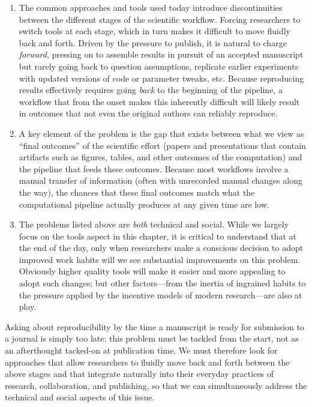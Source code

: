 \documentclass[11pt,oneside,english]{article}
\begin{document}
\begin{enumerate}


\item The common approaches and tools used today introduce discontinuities
  between the different stages of the scientific workflow. Forcing researchers to switch tools
  at each stage, which in turn makes it difficult to move fluidly back and forth.
  Driven by the pressure to publish, it is natural to charge
  \emph{forward}, pressing on to assemble results in pursuit of an accepted
  manuscript but rarely going back to question assumptions, replicate earlier
  experiments with updated versions of code or parameter tweaks, etc.  Because
  reproducing results effectively requires going \emph{back} to the
  beginning of the pipeline, a workflow that from the onset makes this
  inherently difficult will likely result in outcomes that not even the
  original authors can reliably reproduce.

\item A key element of the problem is the gap that exists between what
  we view as ``final outcomes'' of the scientific effort (papers and
  presentations that contain artifacts such as figures, tables, and other
  outcomes of the computation) and the pipeline that feeds these outcomes.
  Because most workflows involve a manual transfer of information (often with
  unrecorded manual changes along the way), the chances that these final
  outcomes match what the computational pipeline actually produces at any
  given time are low.

\item The problems listed above are \emph{both} technical and social.  While we
  largely focus on the tools aspect in this chapter, it is critical to understand
  that at the end of the day, only when researchers make a conscious decision to
  adopt improved work habits will we see substantial improvements on this problem.
  Obviously higher quality tools will make it easier and more appealing to
  adopt such changes; but other factors---from the
  inertia of ingrained habits to the pressure applied by the
  incentive models of modern research---are also at play.
\end{enumerate}
Asking about reproducibility by the time a manuscript is
ready for submission to a journal is simply too late: this problem must be
tackled from the start, not as an afterthought tacked-on at publication time.
We must therefore look for approaches that allow researchers to fluidly move
back and forth between the above stages and that integrate naturally into their
everyday practices of research, collaboration, and publishing, so that we can
simultaneously address the technical and social aspects of this issue.
\end{document}
